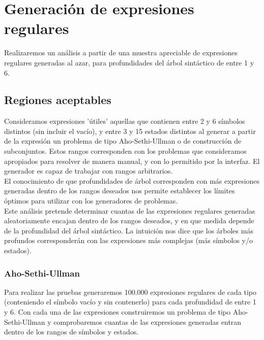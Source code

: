 
\section{Generación de expresiones regulares}


Realizaremos un análisis a partir de una muestra apreciable de expresiones regulares generadas al azar, para profundidades del árbol sintáctico de entre 1 y 6.

\subsection{Regiones aceptables}

Consideramos expresiones 'útiles' aquellas que contienen entre 2 y 6 símbolos distintos (sin incluir el vacío), y entre 3 y 15 estados distintos al generar a partir de la expresión un problema de tipo Aho-Sethi-Ullman o de construcción de subconjuntos.
Estos rangos corresponden con los problemas que consideramos apropiados para resolver de manera manual, y con lo permitido por la interfaz.
El generador es capaz de trabajar con rangos arbitrarios.
\\
El conocimiento de que profundidades de árbol corresponden con más expresiones generadas dentro de los rangos deseados nos permite establecer los límites óptimos para utilizar con los generadores de problemas.
\\
Este análisis pretende determinar cuantas de las expresiones regulares generadas aleatoriamente encajan dentro de los rangos deseados, y en que medida depende de la profundidad del árbol sintáctico.
La intuición nos dice que los árboles más profundos corresponderán con las expresiones más complejas (más símbolos y/o estados).

\subsubsection{Aho-Sethi-Ullman}

Para realizar las pruebas generaremos 100.000 expresiones regulares de cada tipo (conteniendo el símbolo vacío y sin contenerlo) para cada profundidad de entre 1 y 6.
Con cada una de las expresiones construiremos un problema de tipo Aho-Sethi-Ullman y comprobaremos cuantas de las expresiones generadas entran dentro de los rangos de símbolos y estados.

